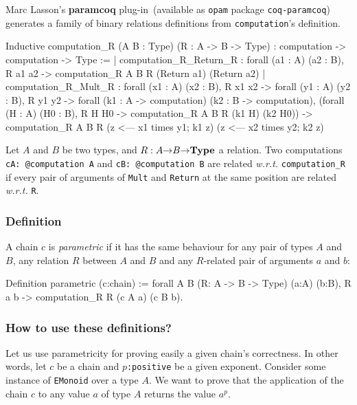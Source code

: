 
Marc Lasson's \textbf{paramcoq} plug-in~(available as  \texttt{opam} package 
\texttt{coq-paramcoq}) generates  a family of binary relations definitions
from \texttt{computation}'s definition.

\begin{Coqanswer}
Inductive
computation_R (A B : Type) (R : A -> B -> Type)
  : computation -> computation -> Type :=
 |    computation_R_Return_R : 
       forall (a1 : A) (a2 : B),  R a1 a2 ->
         computation_R A B R (Return a1) (Return a2)
  | computation_R_Mult_R : forall (x1 : A) (x2 : B),
         R x1 x2 ->
          forall (y1 : A) (y2 : B),
            R y1 y2 ->
            forall (k1 : A -> computation)
                   (k2 : B -> computation),
                      (forall (H : A) (H0 : B),
                          R H H0 -> 
                          computation_R A B R (k1 H) (k2 H0)) ->
                       computation_R A  B R 
                          (z <--- x1 times y1; k1 z)
                          (z <--- x2 times y2; k2 z)
\end{Coqanswer}


Let $A$ and $B$  be two types, and $R: A \mbox{$\rightarrow$} B \mbox{$\rightarrow$} \textbf{Type}$ 
a relation.
Two computations \texttt{cA: @computation A} and \texttt{cB: @computation B}
are related \emph{w.r.t.} \texttt{computation\_R} if every pair of 
arguments of \texttt{Mult} and \texttt{Return} at the same position 
are related \emph{w.r.t.} \texttt{R}.


\subsubsection{Definition}
A chain $c$ is \emph{parametric} if it has the same behaviour for any
pair of types $A$  and $B$, any relation $R$
between  $A$ and $B$ and any $R$-related pair of 
arguments $a$ and $b$:

\begin{Coqsrc}
Definition parametric (c:chain) :=
  forall A B (R: A -> B -> Type) (a:A) (b:B),
   R a b -> computation_R  R (c A a) (c B b).
\end{Coqsrc}

\subsubsection{How to use these definitions?}
Let us use parametricity for proving easily 
a given chain's correctness.
In other words, 
let $c$ be a chain and \texttt{$p$:positive} be a given exponent.
Consider some instance of \texttt{EMonoid} over a type $A$.
We want to prove that the application of the chain $c$ to 
any value $a$ of type $A$ returns the value \texttt{$a^p$}.

